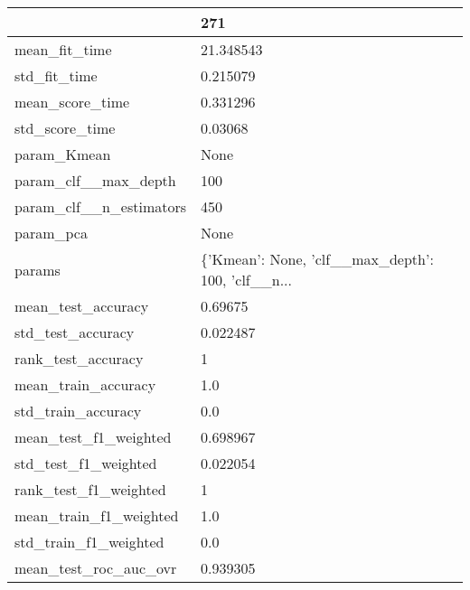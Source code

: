 \begin{tabular}{ll}
\toprule
{} &                                                271 \\
\midrule
mean\_fit\_time               &                                          21.348543 \\
std\_fit\_time                &                                           0.215079 \\
mean\_score\_time             &                                           0.331296 \\
std\_score\_time              &                                            0.03068 \\
param\_Kmean                 &                                               None \\
param\_clf\_\_max\_depth        &                                                100 \\
param\_clf\_\_n\_estimators     &                                                450 \\
param\_pca                   &                                               None \\
params                      &  \{'Kmean': None, 'clf\_\_max\_depth': 100, 'clf\_\_n... \\
mean\_test\_accuracy          &                                            0.69675 \\
std\_test\_accuracy           &                                           0.022487 \\
rank\_test\_accuracy          &                                                  1 \\
mean\_train\_accuracy         &                                                1.0 \\
std\_train\_accuracy          &                                                0.0 \\
mean\_test\_f1\_weighted       &                                           0.698967 \\
std\_test\_f1\_weighted        &                                           0.022054 \\
rank\_test\_f1\_weighted       &                                                  1 \\
mean\_train\_f1\_weighted      &                                                1.0 \\
std\_train\_f1\_weighted       &                                                0.0 \\
mean\_test\_roc\_auc\_ovr       &                                           0.939305 \\

\end{tabular}
